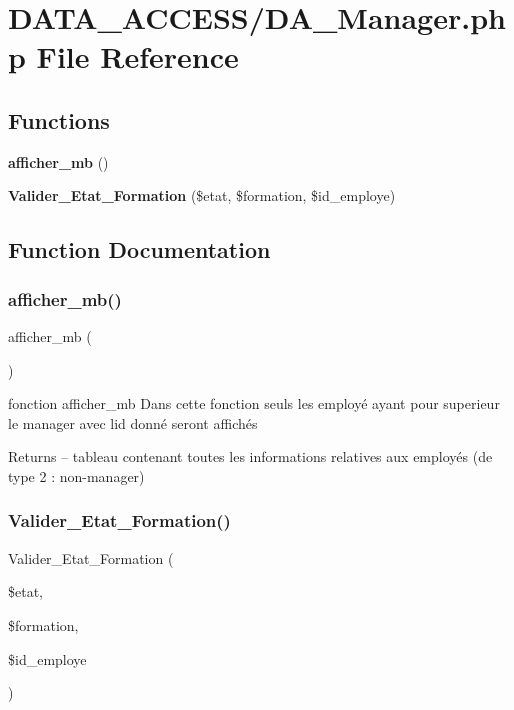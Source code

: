 \section{D\+A\+T\+A\+\_\+\+A\+C\+C\+E\+S\+S/\+D\+A\+\_\+\+Manager.php File Reference}
\label{_d_a___manager_8php}
\subsection*{Functions}
\begin{DoxyCompactItemize}
\item 
\textbf{ afficher\+\_\+mb} ()
\item 
\textbf{ Valider\+\_\+\+Etat\+\_\+\+Formation} (\$etat, \$formation, \$id\+\_\+employe)
\end{DoxyCompactItemize}


\subsection{Function Documentation}
\mbox{\label{_d_a___manager_8php_a76cf6bd4b45d91fa79ccaeb2f7524baf}} 
\subsubsection{afficher\+\_\+mb()}
{\footnotesize\ttfamily afficher\+\_\+mb (\begin{DoxyParamCaption}{ }\end{DoxyParamCaption})}

fonction afficher\+\_\+mb Dans cette fonction seuls les employé ayant pour superieur le manager avec l\textquotesingle{}id donné seront affichés \begin{DoxyReturn}{Returns}
-- tableau contenant toutes les informations relatives aux employés (de type 2 \+: non-\/manager) 
\end{DoxyReturn}
\mbox{\label{_d_a___manager_8php_a611bac5ebcab1eba4fde1dd61363ea49}} 
\subsubsection{Valider\+\_\+\+Etat\+\_\+\+Formation()}
{\footnotesize\ttfamily Valider\+\_\+\+Etat\+\_\+\+Formation (\begin{DoxyParamCaption}\item[{}]{\$etat,  }\item[{}]{\$formation,  }\item[{}]{\$id\+\_\+employe }\end{DoxyParamCaption})}

